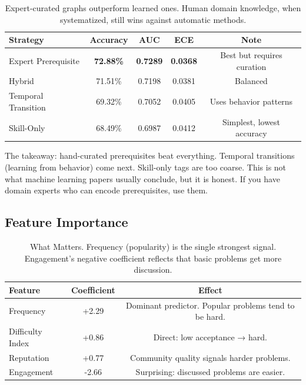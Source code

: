 \documentclass[conference]{IEEEtran}
\begin{document}
\begin{table}[h]
\centering
\small
\begin{tabular}{l|c|c|c|c}
\toprule
\textbf{Strategy} & \textbf{Accuracy} & \textbf{AUC} & \textbf{ECE} & \textbf{Note} \\
\midrule
Expert Prerequisite & \textbf{72.88\%} & \textbf{0.7289} & \textbf{0.0368} & Best but requires curation \\
Hybrid & 71.51\% & 0.7198 & 0.0381 & Balanced \\
Temporal Transition & 69.32\% & 0.7052 & 0.0405 & Uses behavior patterns \\
Skill-Only & 68.49\% & 0.6987 & 0.0412 & Simplest, lowest accuracy \\
\bottomrule
\end{tabular}
\caption{Expert-curated graphs outperform learned ones. Human domain knowledge, when systematized, still wins against automatic methods.}
\label{tab:graphs}
\end{table}

The takeaway: hand-curated prerequisites beat everything. Temporal transitions (learning from behavior) come next. Skill-only tags are too coarse. This is not what machine learning papers usually conclude, but it is honest. If you have domain experts who can encode prerequisites, use them.

\subsection{Feature Importance}

\begin{table}[h]
\centering
\small
\begin{tabular}{l|c|c}
\toprule
\textbf{Feature} & \textbf{Coefficient} & \textbf{Effect} \\
\midrule
Frequency & +2.29 & Dominant predictor. Popular problems tend to be hard. \\
Difficulty Index & +0.86 & Direct: low acceptance → hard. \\
Reputation & +0.77 & Community quality signals harder problems. \\
Engagement & -2.66 & Surprising: discussed problems are easier. \\
\bottomrule
\end{tabular}
\caption{What Matters. Frequency (popularity) is the single strongest signal. Engagement's negative coefficient reflects that basic problems get more discussion.}
\label{tab:coef}
\end{table}
\end{document}
